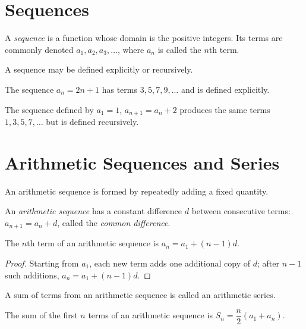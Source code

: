 \section{Sequences}

\begin{definition}
A \emph{sequence} is a function whose domain is the positive integers.
Its terms are commonly denoted $a_1, a_2, a_3, \dots$, where $a_n$ is
called the $n$th term.
\end{definition}

A sequence may be defined explicitly or recursively.

\begin{example}
The sequence $a_n = 2n+1$ has terms $3, 5, 7, 9, \dots$ and is defined
explicitly.
\end{example}

\begin{example}
The sequence defined by $a_1 = 1$, $a_{n+1} = a_n+2$ produces the same
terms $1, 3, 5, 7, \dots$ but is defined recursively.
\end{example}

\section{Arithmetic Sequences and Series}

An arithmetic sequence is formed by repeatedly adding a fixed quantity.

\begin{definition}
An \emph{arithmetic sequence} has a constant difference $d$ between
consecutive terms: $a_{n+1} = a_n+d$, called the \emph{common
difference}.
\end{definition}

\begin{theorem}
The $n$th term of an arithmetic sequence is $a_n = a_1+(n-1)d$.
\end{theorem}

\begin{proof}
Starting from $a_1$, each new term adds one additional copy of $d$; after
$n-1$ such additions, $a_n = a_1+(n-1)d$.
\end{proof}

A sum of terms from an arithmetic sequence is called an arithmetic
series.

\begin{theorem}
The sum of the first $n$ terms of an arithmetic sequence is $S_n =
\dfrac{n}{2}(a_1+a_n)$.
\end{theorem}

